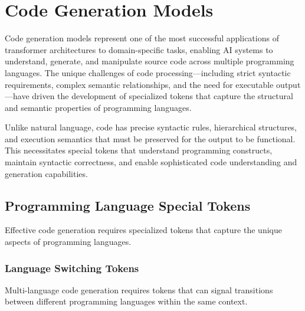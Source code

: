 
\section{Code Generation Models}

Code generation models represent one of the most successful applications of transformer architectures to domain-specific tasks, enabling AI systems to understand, generate, and manipulate source code across multiple programming languages. The unique challenges of code processing—including strict syntactic requirements, complex semantic relationships, and the need for executable output—have driven the development of specialized tokens that capture the structural and semantic properties of programming languages.

Unlike natural language, code has precise syntactic rules, hierarchical structures, and execution semantics that must be preserved for the output to be functional. This necessitates special tokens that understand programming constructs, maintain syntactic correctness, and enable sophisticated code understanding and generation capabilities.

\subsection{Programming Language Special Tokens}

Effective code generation requires specialized tokens that capture the unique aspects of programming languages.

\subsubsection{Language Switching Tokens}

Multi-language code generation requires tokens that can signal transitions between different programming languages within the same context.

